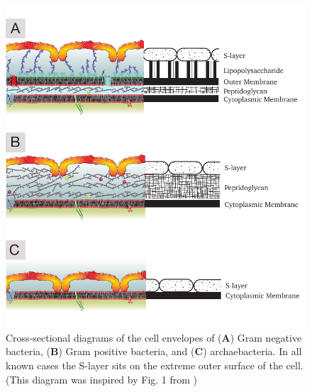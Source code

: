     \begin{figure}[p]
        \begin{center}
            \includegraphics[]{intro/img/celwalls.pdf}
        \end{center}
        \caption[Cross-sectional diagrams of the cell envelopes]{Cross-sectional diagrams of the cell envelopes of (\textbf{A}) Gram negative bacteria, (\textbf{B}) Gram positive bacteria, and (\textbf{C}) archaebacteria. In all known cases the \ac{S-layer} sits on the extreme outer surface of the cell. (This diagram was inspired by Fig. 1 from )}
        \label{fig:cellwalls}
    \end{figure}


\endinput

Any text after an \endinput is ignored.
You could put scraps here or things in progress.
